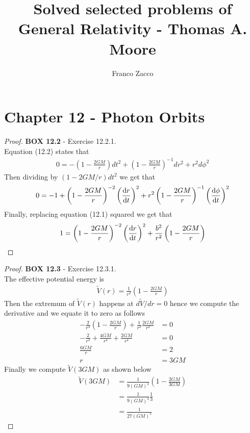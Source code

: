 \documentclass[11pt]{article}
\title{\textbf{Solved selected problems of General Relativity - Thomas A. Moore}}
\author{Franco Zacco}
\date{}
\theoremstyle{definition}
\begin{document}
\maketitle
\thispagestyle{empty}

\section*{Chapter 12 - Photon Orbits}

\begin{proof}{\textbf{BOX 12.2} - Exercise 12.2.1.}\\
    Equation (12.2) states that
    \begin{align*}
        0 = -\left(1- \frac{2GM}{r}\right)dt^2
        + \left(1- \frac{2GM}{r}\right)^{-1}dr^2 + r^2d\phi^2
    \end{align*}
    Then dividing by $(1-2GM/r)dt^2$ we get that
    \begin{align*}
        0 = -1 + \left(1- \frac{2GM}{r}\right)^{-2}\left(\dv{r}{t}\right)^2
        + r^2\left(1- \frac{2GM}{r}\right)^{-1}\left(\dv{\phi}{t}\right)^2
    \end{align*}
    Finally, replacing equation (12.1) squared we get that
    \begin{align*}
        1 = \left(1- \frac{2GM}{r}\right)^{-2}\left(\dv{r}{t}\right)^2
        + \frac{b^2}{r^2}\left(1- \frac{2GM}{r}\right)
    \end{align*}
\end{proof}
\cleardoublepage
\begin{proof}{\textbf{BOX 12.3} - Exercise 12.3.1.}\\
    The effective potential energy is
    \begin{align*}
        \tilde{V}(r) = \frac{1}{r^2}\left(1 - \frac{2GM}{r}\right)
    \end{align*}
    Then the extremum of $\tilde{V}(r)$ happens at $d\tilde{V}/dr = 0$
    hence we compute the derivative and we equate it to zero as follows
    \begin{align*}
        -\frac{2}{r^3}\left(1 - \frac{2GM}{r}\right)
        + \frac{1}{r^2}\frac{2GM}{r^2} &= 0\\
        -\frac{2}{r^3} + \frac{4GM}{r^4}
        + \frac{2GM}{r^4} &= 0\\
        \frac{6GM}{r} &= 2\\
        r &= 3GM
    \end{align*}
    Finally we compute $\tilde{V}(3GM)$ as shown below
    \begin{align*}
        \tilde{V}(3GM) &= \frac{1}{9(GM)^2}\left(1 - \frac{2GM}{3GM}\right)\\
        &= \frac{1}{9(GM)^2}\frac{1}{3}\\
        &= \frac{1}{27(GM)^2}
    \end{align*}
\end{proof}
\end{document}
